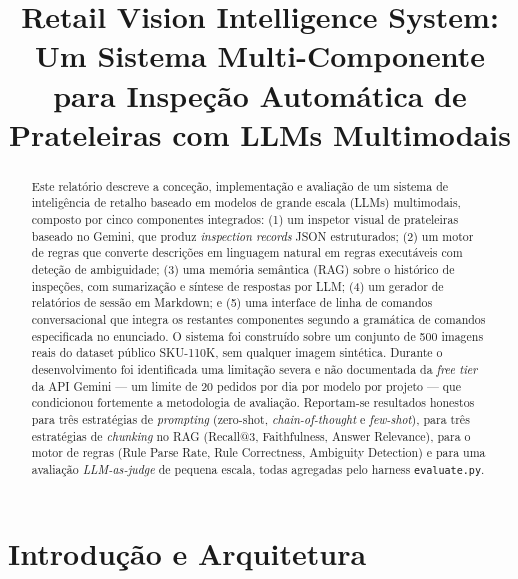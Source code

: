 \documentclass[conference]{IEEEtran}
\begin{document}
\title{Retail Vision Intelligence System: \\
Um Sistema Multi-Componente para Inspeção Automática de Prateleiras com LLMs Multimodais}

\author{
}

\maketitle

\begin{abstract}
Este relatório descreve a conceção, implementação e avaliação de um sistema de
inteligência de retalho baseado em modelos de grande escala (LLMs)
multimodais, composto por cinco componentes integrados: (1) um inspetor
visual de prateleiras baseado no Gemini, que produz \textit{inspection
records} JSON estruturados; (2) um motor de regras que converte descrições em
linguagem natural em regras executáveis com deteção de ambiguidade; (3) uma
memória semântica (RAG) sobre o histórico de inspeções, com sumarização e
síntese de respostas por LLM; (4) um gerador de relatórios de sessão em
Markdown; e (5) uma interface de linha de comandos conversacional que integra
os restantes componentes segundo a gramática de comandos especificada no
enunciado. O sistema foi construído sobre um conjunto de 500 imagens reais do
dataset público SKU-110K, sem qualquer imagem sintética. Durante o
desenvolvimento foi identificada uma limitação severa e não documentada da
\textit{free tier} da API Gemini --- um limite de 20 pedidos por dia por
modelo por projeto --- que condicionou fortemente a metodologia de avaliação.
Reportam-se resultados honestos para três estratégias de \textit{prompting}
(zero-shot, \textit{chain-of-thought} e \textit{few-shot}), para três
estratégias de \textit{chunking} no RAG (Recall@3, Faithfulness, Answer
Relevance), para o motor de regras (Rule Parse Rate, Rule Correctness,
Ambiguity Detection) e para uma avaliação \textit{LLM-as-judge} de pequena
escala, todas agregadas pelo harness \texttt{evaluate.py}.
\end{abstract}

\section{Introdução e Arquitetura}
\label{sec:intro}
\end{document}
